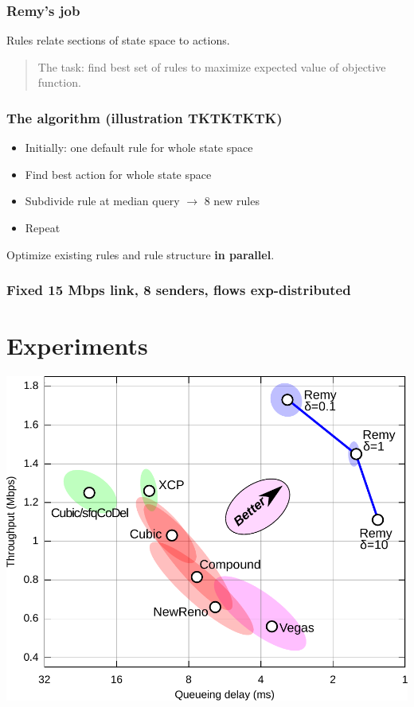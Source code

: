 \documentclass[svgnames]{beamer}
\newcommand{\ssline}{\vspace{8 pt}}
\begin{document}
\begin{frame}
\frametitle{Remy's job}

Rules relate sections of state space to actions.

\begin{quote}
The task: find best set of rules to maximize expected value of
objective function.

\end{quote}

\end{frame}

\begin{frame}
\frametitle{The algorithm (illustration TKTKTKTK)}

\begin{itemize}
\item Initially: one default rule for whole state space

\item Find best action for whole state space

\item Subdivide rule at median query $\rightarrow$ 8 new rules

\item Repeat

\end{itemize}

\ssline

Optimize existing rules and rule structure \textbf{in parallel}.

\end{frame}

\begin{frame}
\frametitle{Fixed 15 Mbps link, 8 senders, flows exp-distributed}

\section{Experiments}

\noindent \includegraphics[width=8.5 cm]{eth8-final-bytes.pdf}

\end{frame}
\end{document}
